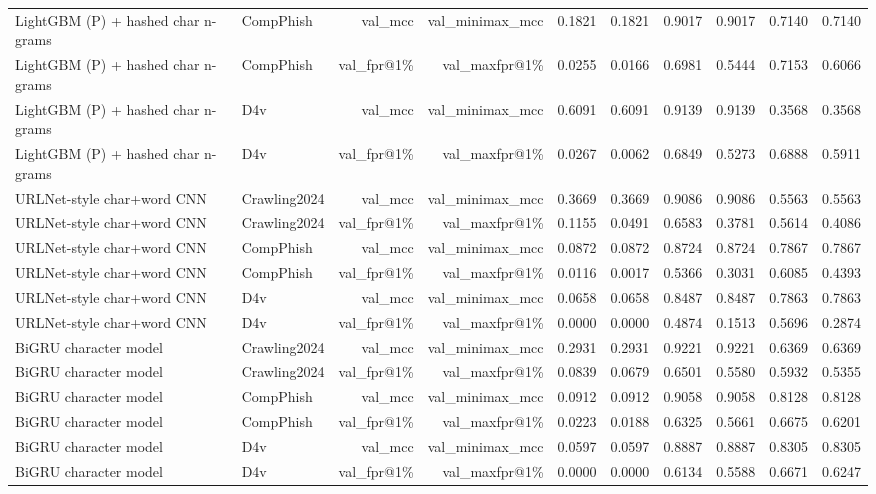 \begin{table}[t]
\begin{tabular}{llrrrrrrrr}
LightGBM (P) + hashed char n-grams & CompPhish & val\_mcc & val\_minimax\_mcc & 0.1821 & 0.1821 & 0.9017 & 0.9017 & 0.7140 & 0.7140 \\
LightGBM (P) + hashed char n-grams & CompPhish & val\_fpr@1\% & val\_maxfpr@1\% & 0.0255 & 0.0166 & 0.6981 & 0.5444 & 0.7153 & 0.6066 \\
LightGBM (P) + hashed char n-grams & D4v & val\_mcc & val\_minimax\_mcc & 0.6091 & 0.6091 & 0.9139 & 0.9139 & 0.3568 & 0.3568 \\
LightGBM (P) + hashed char n-grams & D4v & val\_fpr@1\% & val\_maxfpr@1\% & 0.0267 & 0.0062 & 0.6849 & 0.5273 & 0.6888 & 0.5911 \\
URLNet-style char+word CNN & Crawling2024 & val\_mcc & val\_minimax\_mcc & 0.3669 & 0.3669 & 0.9086 & 0.9086 & 0.5563 & 0.5563 \\
URLNet-style char+word CNN & Crawling2024 & val\_fpr@1\% & val\_maxfpr@1\% & 0.1155 & 0.0491 & 0.6583 & 0.3781 & 0.5614 & 0.4086 \\
URLNet-style char+word CNN & CompPhish & val\_mcc & val\_minimax\_mcc & 0.0872 & 0.0872 & 0.8724 & 0.8724 & 0.7867 & 0.7867 \\
URLNet-style char+word CNN & CompPhish & val\_fpr@1\% & val\_maxfpr@1\% & 0.0116 & 0.0017 & 0.5366 & 0.3031 & 0.6085 & 0.4393 \\
URLNet-style char+word CNN & D4v & val\_mcc & val\_minimax\_mcc & 0.0658 & 0.0658 & 0.8487 & 0.8487 & 0.7863 & 0.7863 \\
URLNet-style char+word CNN & D4v & val\_fpr@1\% & val\_maxfpr@1\% & 0.0000 & 0.0000 & 0.4874 & 0.1513 & 0.5696 & 0.2874 \\
BiGRU character model & Crawling2024 & val\_mcc & val\_minimax\_mcc & 0.2931 & 0.2931 & 0.9221 & 0.9221 & 0.6369 & 0.6369 \\
BiGRU character model & Crawling2024 & val\_fpr@1\% & val\_maxfpr@1\% & 0.0839 & 0.0679 & 0.6501 & 0.5580 & 0.5932 & 0.5355 \\
BiGRU character model & CompPhish & val\_mcc & val\_minimax\_mcc & 0.0912 & 0.0912 & 0.9058 & 0.9058 & 0.8128 & 0.8128 \\
BiGRU character model & CompPhish & val\_fpr@1\% & val\_maxfpr@1\% & 0.0223 & 0.0188 & 0.6325 & 0.5661 & 0.6675 & 0.6201 \\
BiGRU character model & D4v & val\_mcc & val\_minimax\_mcc & 0.0597 & 0.0597 & 0.8887 & 0.8887 & 0.8305 & 0.8305 \\
BiGRU character model & D4v & val\_fpr@1\% & val\_maxfpr@1\% & 0.0000 & 0.0000 & 0.6134 & 0.5588 & 0.6671 & 0.6247 \\

\end{tabular}
\end{table}
